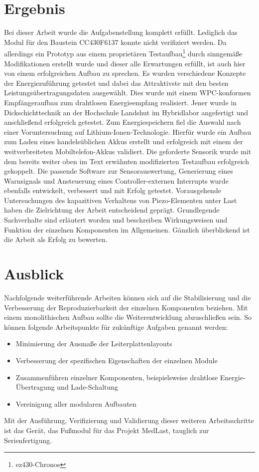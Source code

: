 \documentclass[12pt]{scrreprt} %
\begin{document}
\chapter{Ergebnis}
Bei dieser Arbeit wurde die Aufgabenstellung komplett erfüllt. Lediglich das Modul für den Baustein CC430F6137 konnte nicht verifiziert werden. Da allerdings ein Prototyp aus einem proprietären Testaufbau\footnote{ez430-Chronos} durch sinngemäße Modifikationen erstellt wurde und dieser alle Erwartungen erfüllt, ist auch hier von einem erfolgreichen Aufbau zu sprechen. Es wurden verschiedene Konzepte der Energiezuführung getestet und dabei das Attraktivste mit den besten Leistungsübertragungsdaten ausgewählt. Dies wurde mit einem WPC-konformen Empfängeraufbau zum drahtlosen Energieempfang realisiert. Jener wurde in Dickschichttechnik an der Hochschule Landshut im Hybridlabor angefertigt und anschließend erfolgreich getestet. Zum Energiespeichern fiel die Auswahl nach einer Voruntersuchung auf Lithium-Ionen-Technologie. Hierfür wurde ein Aufbau zum Laden eines handelsüblichen Akkus erstellt und erfolgreich mit einem der weitverbreiteten Mobiltelefon-Akkus validiert. Die geforderte Sensorik wurde mit dem bereits weiter oben im Text erwähnten modifizierten Testaufbau erfolgreich gekoppelt. Die passende Software zur Sensorauswertung, Generierung eines Warnsignals und Ansteuerung eines Controller-externen Interrupts wurde ebenfalls entwickelt, verbessert und mit Erfolg getestet. Vorausgehende Untersuchungen des kapazitiven Verhaltens von Piezo-Elementen unter Last haben die Zielrichtung der Arbeit entscheidend geprägt. Grundlegende Sachverhalte sind erläutert worden und beschreiben Wirkungsweisen und Funktion der einzelnen Komponenten im Allgemeinen. Gänzlich überblickend ist die Arbeit als Erfolg zu bewerten. 
\chapter{Ausblick}
Nachfolgende weiterführende Arbeiten können sich auf die Stabilisierung und die Verbesserung der Reproduzierbarkeit der einzelnen Komponenten beziehen. Mit einem monolithischen Aufbau sollte die Weiterentwicklung abzuschließen sein. So können folgende Arbeitspunkte für zukünftige Aufgaben genannt werden:
\begin{itemize}
\item
Minimierung der Ausmaße der Leiterplattenlayouts
\item
Verbesserung der spezifischen Eigenschaften der einzelnen Module
\item
Zusammenführen einzelner Komponenten, beispielsweise drahtlose Energie-Übertragung und Lade-Schaltung
\item
Vereinigung aller modularen Aufbauten
\end{itemize}
Mit der Ausführung, Verifizierung und Validierung dieser weiteren Arbeitsschritte ist das Gerät, das Fußmodul für das Projekt MedLast, tauglich zur Serienfertigung.
\listoffigures
\lstlistoflistings
\listoftables
{}


\end{document}
